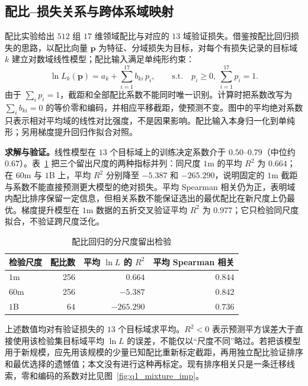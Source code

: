 \subsection{配比--损失关系与跨体系域映射}
配比实验给出 $512$ 组 $17$ 维领域配比与对应的 $13$ 域验证损失。借鉴按配比回归损失的思路\cite{regmix2024}，以配比向量 $\bm p$ 为特征、分域损失为目标，对每个有损失记录的目标域 $k$ 建立对数域线性模型；配比输入满足单纯形约束：
\begin{equation}
\ln \hat L_k(\bm p)=a_k+\sum_{i=1}^{17} b_{ki}\,p_i,
\qquad \text{s.t.}\quad p_i\ge 0,\ \sum_{i=1}^{17}p_i=1 .
\label{eq:q1-mix}
\end{equation}
由于 $\sum_i p_i=1$，截距和全部配比系数不能同时唯一识别。计算时把系数改写为 $\sum_i b_{ki}=0$ 的等价零和编码，并相应平移截距，使预测不变。图中的平均绝对系数只表示相对平均域的线性对比强度，不是因果影响。配比输入本身归一化到单纯形；另用梯度提升回归作拟合对照。

\textbf{求解与验证。}线性模型在 $13$ 个目标域上的训练决定系数介于 $0.50$--$0.79$（中位约 $0.67$）。表~\ref{tab:q1-mixture-holdout} 把三个留出尺度的两种指标并列：同尺度 $1$m 的平均 $R^2$ 为 $0.664$；在 $60$m 与 $1$B 上，平均 $R^2$ 分别降至 $-5.387$ 和 $-265.290$，说明固定的 $1$m 截距与系数不能直接预测更大模型的绝对损失。平均 Spearman 相关仍为正，表明域内配比排序保留一定信息，但相关系数不能保证选出的最优配比在新尺度上仍最优。梯度提升模型在 $1$m 数据的五折交叉验证平均 $R^2$ 为 $0.977$；它只检验同尺度拟合，不验证跨尺度泛化。

\begin{table}[H]
  \centering
  \caption{配比回归的分尺度留出检验}
  \label{tab:q1-mixture-holdout}
  \small
  \begin{tabular}{lrrr}
    \toprule
    检验尺度 & 配比数 & 平均 $\ln L$ 的 $R^2$ & 平均 Spearman 相关 \\
    \midrule
    $1$m  & 256 & $0.664$ & $0.844$ \\
    $60$m & 256 & $-5.387$ & $0.842$ \\
    $1$B  & 64  & $-265.290$ & $0.736$ \\
    \bottomrule
  \end{tabular}
\end{table}

上述数值均对有验证损失的 $13$ 个目标域求平均。$R^2<0$ 表示预测平方误差大于直接使用该检验集目标域平均 $\ln L$ 的误差，不能仅以“尺度不同”略过。若把该模型用于新规模，应先用该规模的少量已知配比重新标定截距，再用独立配比验证排序和最优选择的遗憾值；本文没有进行这种再标定。现有排序相关只是一条迁移线索，零和编码的系数对比见图~\ref{fig:q1_mixture_imp}。

